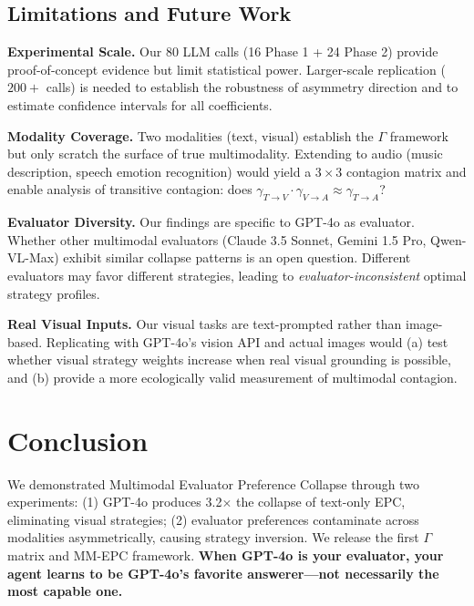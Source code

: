 \documentclass[11pt,a4paper]{article}
\begin{document}
\subsection{Limitations and Future Work}

\textbf{Experimental Scale.} Our 80 LLM calls (16 Phase 1 + 24 Phase 2) provide proof-of-concept evidence but limit statistical power. Larger-scale replication ($200+$ calls) is needed to establish the robustness of asymmetry direction and to estimate confidence intervals for all coefficients.

\textbf{Modality Coverage.} Two modalities (text, visual) establish the $\Gamma$ framework but only scratch the surface of true multimodality. Extending to audio (music description, speech emotion recognition) would yield a $3\times 3$ contagion matrix and enable analysis of transitive contagion: does $\gamma_{T\to V} \cdot \gamma_{V\to A} \approx \gamma_{T\to A}$?

\textbf{Evaluator Diversity.} Our findings are specific to GPT-4o as evaluator. Whether other multimodal evaluators (Claude 3.5 Sonnet, Gemini 1.5 Pro, Qwen-VL-Max) exhibit similar collapse patterns is an open question. Different evaluators may favor different strategies, leading to \textit{evaluator-inconsistent} optimal strategy profiles.

\textbf{Real Visual Inputs.} Our visual tasks are text-prompted rather than image-based. Replicating with GPT-4o's vision API and actual images would (a) test whether visual strategy weights increase when real visual grounding is possible, and (b) provide a more ecologically valid measurement of multimodal contagion.

\section{Conclusion}
We demonstrated Multimodal Evaluator Preference Collapse through two experiments: (1) GPT-4o produces 3.2$\times$ the collapse of text-only EPC, eliminating visual strategies; (2) evaluator preferences contaminate across modalities asymmetrically, causing strategy inversion. We release the first $\Gamma$ matrix and MM-EPC framework. \textbf{When GPT-4o is your evaluator, your agent learns to be GPT-4o's favorite answerer---not necessarily the most capable one.}
\end{document}
